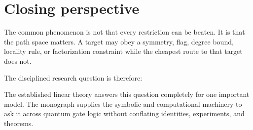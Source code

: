 \section{Closing perspective}
The common phenomenon is not that every restriction can be beaten.  It is that the path space matters.  A target may obey a symmetry, flag, degree bound, locality rule, or factorization constraint while the cheapest route to that target does not.

The disciplined research question is therefore:
\begin{center}
\end{center}
The established linear theory answers this question completely for one important model.  The monograph supplies the symbolic and computational machinery to ask it across quantum gate logic without conflating identities, experiments, and theorems.
